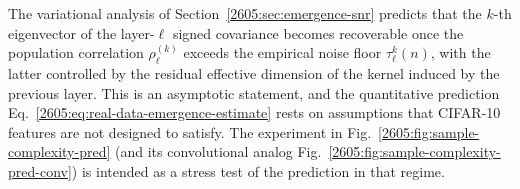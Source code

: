 

The variational analysis of Section~\ref{2605:sec:emergence-snr} predicts
that the $k$-th eigenvector of the layer-$\ell$ signed covariance
becomes recoverable once the population correlation $\rho_\ell^{(k)}$
exceeds the empirical noise floor $\tau_\ell^k(n)$, with the latter
controlled by the residual effective dimension of the kernel induced by
the previous layer.  This is an asymptotic statement, and the
quantitative prediction
Eq.~\eqref{2605:eq:real-data-emergence-estimate} rests on assumptions that
CIFAR-10 features are not designed to satisfy.  The experiment in
Fig.~\ref{2605:fig:sample-complexity-pred} (and its convolutional analog
Fig.~\ref{2605:fig:sample-complexity-pred-conv}) is intended as a stress test
of the prediction in that regime.




